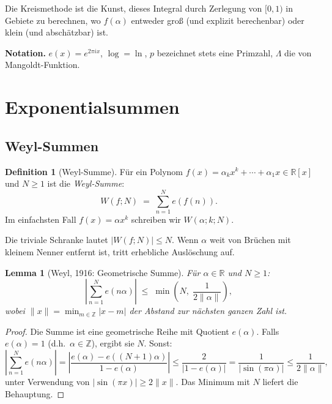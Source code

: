 \documentclass[12pt,a4paper]{amsart}
\newtheorem{lemma}[theorem]{Lemma}
\theoremstyle{definition}
\newtheorem{definition}[theorem]{Definition}
\newcommand{\Z}{\mathbb{Z}}
\newcommand{\R}{\mathbb{R}}
\newcommand{\eq}[1]{e\!\left(#1\right)}
\begin{document}
Die Kreismethode ist die Kunst, dieses Integral durch Zerlegung
von $[0,1)$ in Gebiete zu berechnen, wo $f(\alpha)$ entweder groß
(und explizit berechenbar) oder klein (und abschätzbar) ist.

\textbf{Notation.}  $\eq{x} = e^{2\pi ix}$, $\log = \ln$, $p$
bezeichnet stets eine Primzahl, $\Lambda$ die von Mangoldt-Funktion.

\section{Exponentialsummen}
\label{sec:expsummen}

\subsection{Weyl-Summen}

\begin{definition}[Weyl-Summe]
  Für ein Polynom $f(x) = \alpha_k x^k + \cdots + \alpha_1 x \in \R[x]$
  und $N \geq 1$ ist die \emph{Weyl-Summe}:
  \[
    W(f; N) \;=\; \sum_{n=1}^{N} \eq{f(n)}.
  \]
  Im einfachsten Fall $f(x) = \alpha x^k$ schreiben wir $W(\alpha; k; N)$.
\end{definition}

Die triviale Schranke lautet $|W(f; N)| \leq N$.  Wenn $\alpha$ weit
von Brüchen mit kleinem Nenner entfernt ist, tritt erhebliche
Auslöschung auf.

\begin{lemma}[Weyl, 1916: Geometrische Summe]\label{lem:geom}
  Für $\alpha \in \R$ und $N \geq 1$:
  \[
    \left|\sum_{n=1}^{N} \eq{n\alpha}\right|
    \;\leq\; \min\!\left(N,\; \frac{1}{2\|\alpha\|}\right),
  \]
  wobei $\|x\| = \min_{m \in \Z} |x - m|$ der Abstand zur nächsten
  ganzen Zahl ist.
\end{lemma}

\begin{proof}
  Die Summe ist eine geometrische Reihe mit Quotient $\eq{\alpha}$.
  Falls $\eq{\alpha} = 1$ (d.h.\ $\alpha \in \Z$), ergibt sie $N$.
  Sonst:
  \[
    \left|\sum_{n=1}^N \eq{n\alpha}\right|
    = \left|\frac{\eq{\alpha} - \eq{(N+1)\alpha}}{1 - \eq{\alpha}}\right|
    \leq \frac{2}{|1 - \eq{\alpha}|}
    = \frac{1}{|\sin(\pi\alpha)|}
    \leq \frac{1}{2\|\alpha\|},
  \]
  unter Verwendung von $|\sin(\pi x)| \geq 2\|x\|$.  Das Minimum mit
  $N$ liefert die Behauptung.
\end{proof}
\end{document}
